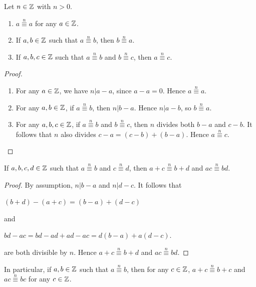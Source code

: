 \documentclass[11pt,fleqn,dvipsnames,usenames]{article}
\newcommand{\p}{\noindent}
\begin{document}
\begin{theorem}\label{congruenceproperties}Let $n\in\mathbb{Z}$ with $n > 0$.
\begin{enumerate}[(1)]
\item $a\overset{n}{\equiv} a$ for any $a\in\mathbb{Z}$.
\item If $a,b\in\mathbb{Z}$ such that $a\overset{n}{\equiv} b$, then $b\overset{n}{\equiv} a$.
\item If $a,b,c\in\mathbb{Z}$ such that $a\overset{n}{\equiv} b$ and $b\overset{n}{\equiv} c$, then $a\overset{n}{\equiv} c$.
\end{enumerate}
\end{theorem}
%
\begin{proof}~
\begin{enumerate}[(1)]
\item For any $a\in\mathbb{Z}$, we have $n|a-a$, since $a-a = 0$.  Hence $a\overset{n}{\equiv} a$.
\item For any $a,b\in\mathbb{Z}$, if $a\overset{n}{\equiv} b$, then $n|b-a$.  Hence $n|a-b$, so $b\overset{n}{\equiv} a$.
\item For any $a,b,c\in\mathbb{Z}$, if $a\overset{n}{\equiv} b$ and $b\overset{n}{\equiv} c$, then $n$ divides both $b-a$ and $c-b$.  It follows that $n$ also divides $c-a = (c-b) + (b-a)$.  Hence $a\overset{n}{\equiv} c$.\hfill \qedhere
\end{enumerate}
\end{proof}
%
\begin{theorem}\label{congruencereplacement}
If $a,b,c,d\in\mathbb{Z}$ such that $a\overset{n}{\equiv} b$ and $c\overset{n}{\equiv} d$, then $a + c\overset{n}{\equiv} b + d$ and $ac\overset{n}{\equiv} bd$.
\end{theorem}
%
\begin{proof}
By assumption, $n|b-a$ and $n|d-c$.  It follows that
\begin{center}
$(b+d) - (a+c) = (b-a) + (d-c)$
\end{center}
and
\begin{center}
$bd - ac = bd - ad + ad - ac = d(b-a) + a(d-c)$.
\end{center}
are both divisible by $n$.  Hence $a + c\overset{n}{\equiv} b + d$ and $ac\overset{n}{\equiv} bd$.
\end{proof}
\vsp

\p In particular, if $a,b\in\mathbb{Z}$ such that $a\overset{n}{\equiv} b$, then for any $c\in\mathbb{Z}$, $a + c\overset{n}{\equiv} b + c$ and $ac\overset{n}{\equiv} bc$ for any $c\in\mathbb{Z}$.
\end{document}
